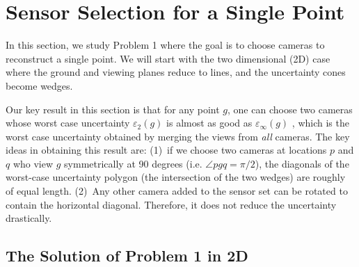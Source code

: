 \section{Sensor Selection for a Single Point}
In this section, we study Problem 1 where the goal is to choose cameras to reconstruct a single point.
We will start with the two dimensional (2D) case where the ground and viewing planes reduce to lines, and the uncertainty cones become wedges.

Our key result in this section is that for any point $g$, one can choose two cameras whose worst case uncertainty $\varepsilon_{2}(g)$ is almost as good as $\varepsilon_{\infty}(g)$ , which is the worst case uncertainty obtained by merging the views from {\em all} cameras. The key ideas in obtaining this result are: (1)~if we choose two cameras at locations $p$ and $q$ who view $g$ symmetrically at 90 degrees (i.e. $\angle p g q = \pi/2$), the diagonals of the worst-case uncertainty polygon (the intersection of the two wedges) are roughly of equal length. (2)~Any other camera added to the sensor set can be rotated to contain the horizontal diagonal. Therefore, it does not reduce the uncertainty drastically. 



%
%

\subsection{The Solution of Problem 1 in 2D}

